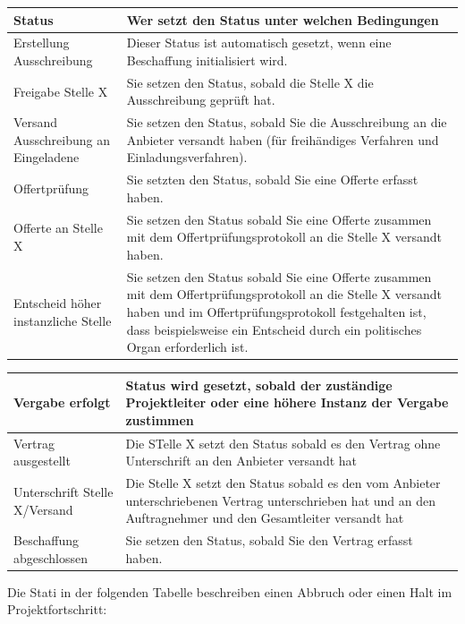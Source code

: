\begin{tabular}{|p{5cm}|p{9.5cm}|}    %
\hline
\textbf{Status} & \textbf{Wer setzt den Status unter welchen Bedingungen} \\
\hline
Erstellung Ausschreibung & Dieser Status ist automatisch gesetzt, wenn eine Beschaffung initialisiert wird. \\
\hline
Freigabe Stelle X & Sie setzen den Status, sobald die Stelle X die Ausschreibung geprüft hat. \\
\hline
Versand Ausschreibung an Eingeladene & Sie setzen den Status, sobald Sie die Ausschreibung an die Anbieter versandt haben (für freihändiges
Verfahren und Einladungsverfahren). \\
\hline
Offertprüfung & Sie setzten den Status, sobald Sie eine Offerte erfasst haben. \\
\hline
Offerte an Stelle X & Sie setzen den Status sobald Sie eine Offerte zusammen mit dem Offertprüfungsprotokoll an die Stelle X versandt haben. \\
\hline
Entscheid höher instanzliche Stelle & Sie setzen den Status sobald Sie eine Offerte zusammen mit dem Offertprüfungsprotokoll an die Stelle X versandt haben und im Offertprüfungsprotokoll festgehalten ist, dass beispielsweise ein Entscheid durch ein politisches Organ erforderlich ist. \\
\hline
\end{tabular}

\begin{tabular}{|p{5cm}|p{9.5cm}|}    %
\hline
Vergabe erfolgt & Status wird gesetzt, sobald der zuständige Projektleiter oder eine höhere Instanz der Vergabe zustimmen \\
\hline
Vertrag ausgestellt & Die STelle X setzt den Status sobald es den Vertrag ohne Unterschrift an den Anbieter versandt hat \\
\hline
Unterschrift Stelle X/Versand & Die Stelle X setzt den Status sobald es den vom Anbieter unterschriebenen Vertrag unterschrieben hat und an den Auftragnehmer und den Gesamtleiter versandt hat \\
\hline
Beschaffung abgeschlossen & Sie setzen den Status, sobald Sie den Vertrag erfasst haben. \\
\hline
\end{tabular}

\vspace{\baselineskip}

Die Stati in der folgenden Tabelle beschreiben einen Abbruch oder einen Halt im Projektfortschritt:

